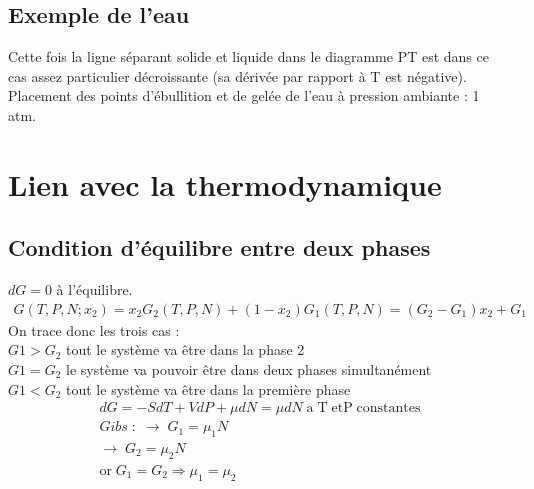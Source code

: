 \documentclass[12pt,prb,aps,epsf]{report}
\begin{document}
\subsection{Exemple de l'eau}
Cette fois la ligne séparant solide et liquide dans le diagramme PT est dans ce cas assez particulier décroissante (sa dérivée par rapport à T est négative).\\
Placement des points d'ébullition et de gelée de l'eau à pression ambiante : 1 atm.

\section{Lien avec la thermodynamique}

\subsection{Condition d'équilibre entre deux phases}

$dG =0$ à l'équilibre.
\begin{eqnarray}
G(T,P,N;x_2) = x_2G_2(T,P,N) + (1-x_2)G_1(T,P,N) = (G_2-G_1)x_2 + G_1
\end{eqnarray}
On trace donc les trois cas :\\

$G1>G_2$ tout le système va être dans la phase 2\\

$G1=G_2$ le système va pouvoir être dans deux phases simultanément\\

$G1<G_2$ tout le système va être dans la première phase\\
\begin{eqnarray}
dG = -SdT + VdP + \mu dN = \mu dN\;\mathrm{a\;T\;etP\;constantes}\\
Gibs\; :\; \rightarrow \;G_1 = \mu_1N\\
\rightarrow\; G_2 = \mu_2 N\\
\mathrm{or}\; G_1=G_2  \Rightarrow \mu_1=\mu_2
\end{eqnarray}
\end{document}
